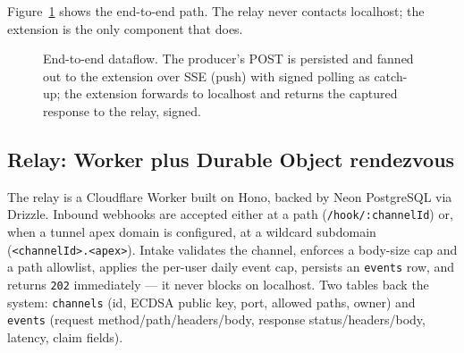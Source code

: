 \documentclass[11pt]{article}
\begin{document}
Figure~\ref{fig:dataflow} shows the end-to-end path. The relay never contacts
localhost; the extension is the only component that does.

\begin{figure}[t]
\centering
{}
\caption{End-to-end dataflow. The producer's POST is persisted and fanned out
to the extension over SSE (push) with signed polling as catch-up; the extension
forwards to localhost and returns the captured response to the relay, signed.}
\label{fig:dataflow}
\end{figure}

\subsection{Relay: Worker plus Durable Object rendezvous}
\label{sec:relay}

The relay is a Cloudflare Worker built on Hono, backed by Neon
PostgreSQL via Drizzle. Inbound webhooks are accepted either at a path
(\texttt{/hook/:channelId}) or, when a tunnel apex domain is configured, at a
wildcard subdomain (\texttt{<channelId>.<apex>}). Intake validates the channel,
enforces a body-size cap and a path allowlist, applies the per-user daily event
cap, persists an \texttt{events} row, and returns \texttt{202} immediately ---
it never blocks on localhost. Two tables back the system: \texttt{channels}
(id, ECDSA public key, port, allowed paths, owner) and \texttt{events} (request
method/path/headers/body, response status/headers/body, latency, claim
fields).
\end{document}
